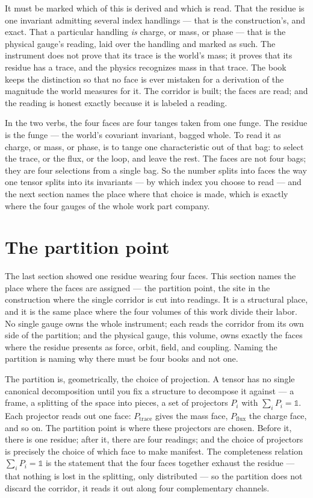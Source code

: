 It must be marked which of this is derived and which is read. That the residue is one invariant admitting several index
handlings --- that is the construction's, and exact. That a particular handling \emph{is} charge, or mass, or phase --- that
is the physical gauge's reading, laid over the handling and marked as such. The instrument does not prove that its trace is
the world's mass; it proves that its residue has a trace, and the physics recognizes mass in that trace. The book keeps the
distinction so that no face is ever mistaken for a derivation of the magnitude the world measures for it. The corridor is
built; the faces are read; and the reading is honest exactly because it is labeled a reading.

In the two verbs, the four faces are four tanges taken from one funge. The residue is the funge --- the world's covariant
invariant, bagged whole. To read it as charge, or mass, or phase, is to tange one characteristic out of that bag: to select
the trace, or the flux, or the loop, and leave the rest. The faces are not four bags; they are four selections from a single
bag. So the number splits into faces the way one tensor splits into its invariants --- by which index you choose to read ---
and the next section names the place where that choice is made, which is exactly where the four gauges of the whole work part
company.

\section{The partition point}

The last section showed one residue wearing four faces. This section names the place where the faces are assigned --- the
partition point, the site in the construction where the single corridor is cut into readings. It is a structural place, and
it is the same place where the four volumes of this work divide their labor. No single gauge owns the whole instrument; each
reads the corridor from its own side of the partition; and the physical gauge, this volume, owns exactly the faces where the
residue presents as force, orbit, field, and coupling. Naming the partition is naming why there must be four books and not
one.

The partition is, geometrically, the choice of projection. A tensor has no single canonical decomposition until you fix a
structure to decompose it against --- a frame, a splitting of the space into pieces, a set of projectors $P_i$ with $\sum_i
P_i = \mathbb{1}$. Each projector reads out one face: $P_{\text{trace}}$ gives the mass face, $P_{\text{flux}}$ the charge
face, and so on. The partition point is where these projectors are chosen. Before it, there is one residue; after it, there
are four readings; and the choice of projectors is precisely the choice of which face to make manifest. The completeness
relation $\sum_i P_i = \mathbb{1}$ is the statement that the four faces together exhaust the residue --- that nothing is lost
in the splitting, only distributed --- so the partition does not discard the corridor, it reads it out along four
complementary channels.

